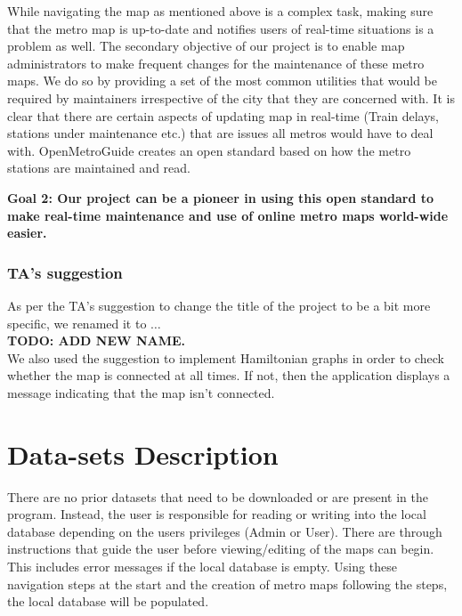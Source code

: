 \documentclass[fontsize=11pt]{article}
\begin{document}
    While navigating the map as mentioned above is a complex task, making sure that the metro map is up-to-date and notifies users of real-time situations is a problem as well. The secondary objective of our project is to enable map administrators to make frequent changes for the maintenance of these metro maps. We do so by providing a set of the most common utilities that would be required by maintainers irrespective of the city that they are concerned with. It is clear that there are certain aspects of updating map in real-time (Train delays, stations under maintenance etc.) that are issues all metros would have to deal with. OpenMetroGuide creates an open standard based on how the metro stations are maintained and read.\newline


    \textbf{Goal 2:
    Our project can be a pioneer in using this open standard to make real-time maintenance and use of online metro maps world-wide easier.
    }\newline

    \subsubsection{TA's suggestion}
    As per the TA's suggestion to change the title of the project to be a bit more specific, we renamed it to $\dots$\\
    \textbf{TODO: ADD NEW NAME.}\\
    We also used the suggestion to implement Hamiltonian graphs in order to check whether the map is connected at all times. If not, then the application displays a message indicating that the map isn't connected.
    \section*{Data-sets Description}
    There are no prior datasets that need to be downloaded or are present in the program. Instead, the user is responsible for reading or writing into the local database depending on the users privileges (Admin or User). There are through instructions that guide the user before viewing/editing of the maps can begin. This includes error messages if the local database is empty. Using these navigation steps at the start and the creation of metro maps following the steps, the local database will be populated.
\end{document}
